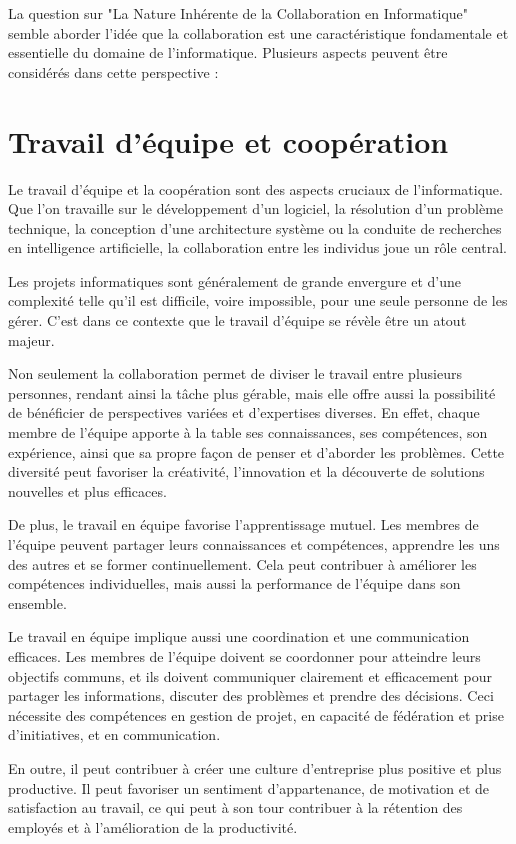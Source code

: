 La question sur "La Nature Inhérente de la Collaboration en Informatique" semble aborder l'idée que la collaboration est une caractéristique fondamentale et essentielle du domaine de l'informatique. Plusieurs aspects peuvent être considérés dans cette perspective :

\section{Travail d'équipe et coopération} 
Le travail d'équipe et la coopération sont des aspects cruciaux de l'informatique. Que l'on travaille sur le développement d'un logiciel, la résolution d'un problème technique, la conception d'une architecture système ou la conduite de recherches en intelligence artificielle, la collaboration entre les individus joue un rôle central. 

Les projets informatiques sont généralement de grande envergure et d'une complexité telle qu'il est difficile, voire impossible, pour une seule personne de les gérer. C'est dans ce contexte que le travail d'équipe se révèle être un atout majeur.

Non seulement la collaboration permet de diviser le travail entre plusieurs personnes, rendant ainsi la tâche plus gérable, mais elle offre aussi la possibilité de bénéficier de perspectives variées et d'expertises diverses. En effet, chaque membre de l'équipe apporte à la table ses connaissances, ses compétences, son expérience, ainsi que sa propre façon de penser et d'aborder les problèmes. Cette diversité peut favoriser la créativité, l'innovation et la découverte de solutions nouvelles et plus efficaces.

De plus, le travail en équipe favorise l'apprentissage mutuel. Les membres de l'équipe peuvent partager leurs connaissances et compétences, apprendre les uns des autres et se former continuellement. Cela peut contribuer à améliorer les compétences individuelles, mais aussi la performance de l'équipe dans son ensemble.

Le travail en équipe implique aussi une coordination et une communication efficaces. Les membres de l'équipe doivent se coordonner pour atteindre leurs objectifs communs, et ils doivent communiquer clairement et efficacement pour partager les informations, discuter des problèmes et prendre des décisions. Ceci nécessite des compétences en gestion de projet, en capacité de fédération et prise d'initiatives, et en communication.

En outre, il peut contribuer à créer une culture d'entreprise plus positive et plus productive. Il peut favoriser un sentiment d'appartenance, de motivation et de satisfaction au travail, ce qui peut à son tour contribuer à la rétention des employés et à l'amélioration de la productivité.

